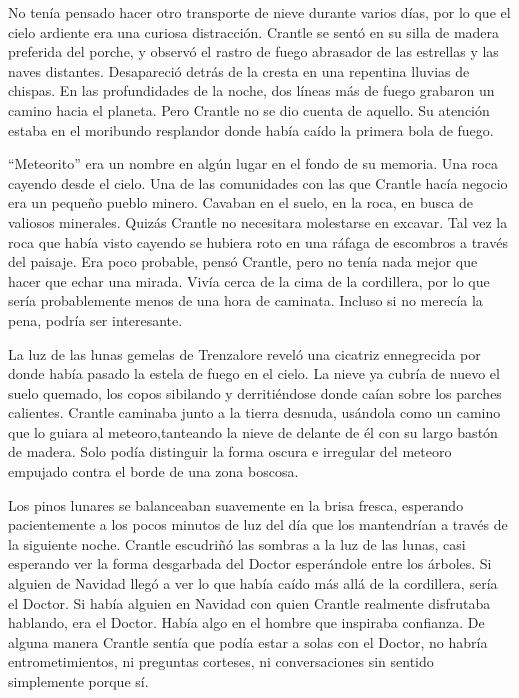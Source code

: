 No tenía pensado hacer otro transporte de nieve durante varios días, por lo que el cielo ardiente era una curiosa distracción. Crantle se sentó en su silla de madera preferida del porche, y observó el rastro de fuego abrasador de las estrellas y las naves distantes. Desapareció detrás de la cresta en una repentina lluvias de chispas. En las profundidades de la noche, dos líneas más de fuego grabaron un camino hacia el planeta. Pero Crantle no se dio cuenta de aquello. Su atención estaba en el moribundo resplandor donde había caído la primera bola de fuego.



``Meteorito'' era un nombre en algún lugar en el fondo de su memoria. Una roca cayendo desde el cielo. Una de las comunidades con las que Crantle hacía negocio era un pequeño pueblo minero. Cavaban en el suelo, en la roca, en busca de valiosos minerales. Quizás Crantle no necesitara molestarse en excavar. Tal vez la roca que había visto cayendo se hubiera roto en una ráfaga de escombros a través del paisaje. Era poco probable, pensó Crantle, pero no tenía nada mejor que hacer que echar una mirada. Vivía cerca de la cima de la cordillera, por lo que sería probablemente menos de una hora de caminata. Incluso si no merecía la pena, podría ser interesante.



\mbox{}



La luz de las lunas gemelas de Trenzalore reveló una cicatriz ennegrecida por donde había pasado la estela de fuego en el cielo. La nieve ya cubría de nuevo el suelo quemado, los copos sibilando y derritiéndose donde caían sobre los parches calientes. Crantle caminaba junto a la tierra desnuda, usándola como un camino que lo guiara al meteoro,tanteando la nieve de delante de él con su largo bastón de madera. Solo podía distinguir la forma oscura e irregular del meteoro empujado contra el borde de una zona boscosa.



Los pinos lunares se balanceaban suavemente en la brisa fresca, esperando pacientemente a los pocos minutos de luz del día que los mantendrían a través de la siguiente noche. Crantle escudriñó las sombras a la luz de las lunas, casi esperando ver la forma desgarbada del Doctor esperándole entre los árboles. Si alguien de Navidad llegó a ver lo que había caído más allá de la cordillera, sería el Doctor. Si había alguien en Navidad con quien Crantle realmente disfrutaba hablando, era el Doctor. Había algo en el hombre que inspiraba confianza. De alguna manera Crantle sentía que podía estar a solas con el Doctor, no habría entrometimientos, ni preguntas corteses, ni conversaciones sin sentido simplemente porque sí.



